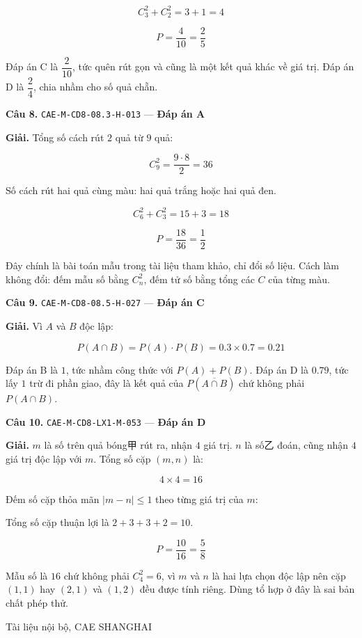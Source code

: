 \documentclass[11pt, a4paper]{article}
\begin{document}
$$C_3^2 + C_2^2 = 3 + 1 = 4$$

$$P = \frac{4}{10} = \frac{2}{5}$$

 Đáp án C là $\dfrac{2}{10}$, tức quên rút gọn và cũng là một kết quả khác về giá trị. Đáp án D là $\dfrac{2}{4}$, chia nhầm cho số quả chẵn.

\textbf{Câu 8.} \texttt{CAE-M-CD8-08.3-H-013} — \textbf{Đáp án A}

\textbf{Giải.} Tổng số cách rút $2$ quả từ $9$ quả:

$$C_9^2 = \frac{9 \cdot 8}{2} = 36$$

Số cách rút hai quả cùng màu: hai quả trắng hoặc hai quả đen.

$$C_6^2 + C_3^2 = 15 + 3 = 18$$

$$P = \frac{18}{36} = \frac{1}{2}$$

 Đây chính là bài toán mẫu trong tài liệu tham khảo, chỉ đổi số liệu. Cách làm không đổi: đếm mẫu số bằng $C_n^2$, đếm tử số bằng tổng các $C$ của từng màu.

\textbf{Câu 9.} \texttt{CAE-M-CD8-08.5-H-027} — \textbf{Đáp án C}

\textbf{Giải.} Vì $A$ và $B$ độc lập:

$$P(A \cap B) = P(A) \cdot P(B) = 0.3 \times 0.7 = 0.21$$

 Đáp án B là $1$, tức nhầm công thức với $P(A) + P(B)$. Đáp án D là $0.79$, tức lấy $1$ trừ đi phần giao, đây là kết quả của $P(\overline{A \cap B})$ chứ không phải $P(A \cap B)$.

\textbf{Câu 10.} \texttt{CAE-M-CD8-LX1-M-053} — \textbf{Đáp án D}

\textbf{Giải.} $m$ là số trên quả bóng甲 rút ra, nhận $4$ giá trị. $n$ là số乙 đoán, cũng nhận $4$ giá trị độc lập với $m$. Tổng số cặp $(m,n)$ là:

$$4 \times 4 = 16$$

Đếm số cặp thỏa mãn $\lvert m - n \rvert \le 1$ theo từng giá trị của $m$:


Tổng số cặp thuận lợi là $2 + 3 + 3 + 2 = 10$.

$$P = \frac{10}{16} = \frac{5}{8}$$

 Mẫu số là $16$ chứ không phải $C_4^2 = 6$, vì $m$ và $n$ là hai lựa chọn độc lập nên cặp $(1,1)$ hay $(2,1)$ và $(1,2)$ đều được tính riêng. Dùng tổ hợp ở đây là sai bản chất phép thử.
\vspace{0.8cm}
\begin{center}
{\footnotesize\color{cae_blue} Tài liệu nội bộ, CAE SHANGHAI}
\end{center}
\end{document}
